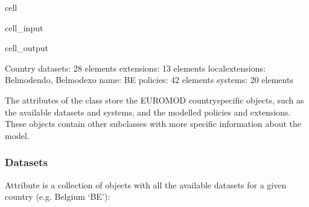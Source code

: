 \documentclass[letterpaper,10pt,english]{sphinxmanual}
\begin{document}
\begin{sphinxuseclass}{cell}
\begin{sphinxuseclass}{cell_input}
\begin{sphinxVerbatim}[commandchars=\\\{\}]
\PYG{p}{[}\PYG{p}{]}
\PYG{p}{[}\PYG{p}{]}
\PYG{p}{[}\PYG{p}{]}
\PYG{p}{[}\PYG{p}{]}
\end{sphinxVerbatim}

\end{sphinxuseclass}
\begin{sphinxuseclass}{cell_output}
\begin{sphinxVerbatim}[commandchars=\\\{\}]
\PYGZhy{}\PYGZhy{}\PYGZhy{}\PYGZhy{}\PYGZhy{}\PYGZhy{}\PYGZhy{}\PYGZhy{}\PYGZhy{}\PYGZhy{}\PYGZhy{}\PYGZhy{}\PYGZhy{}\PYGZhy{}\PYGZhy{}\PYGZhy{}\PYGZhy{}\PYGZhy{}\PYGZhy{}\PYGZhy{}\PYGZhy{}\PYGZhy{}\PYGZhy{}\PYGZhy{}\PYGZhy{}\PYGZhy{}\PYGZhy{}\PYGZhy{}\PYGZhy{}\PYGZhy{}
Country
\PYGZhy{}\PYGZhy{}\PYGZhy{}\PYGZhy{}\PYGZhy{}\PYGZhy{}\PYGZhy{}\PYGZhy{}\PYGZhy{}\PYGZhy{}\PYGZhy{}\PYGZhy{}\PYGZhy{}\PYGZhy{}\PYGZhy{}\PYGZhy{}\PYGZhy{}\PYGZhy{}\PYGZhy{}\PYGZhy{}\PYGZhy{}\PYGZhy{}\PYGZhy{}\PYGZhy{}\PYGZhy{}\PYGZhy{}\PYGZhy{}\PYGZhy{}\PYGZhy{}\PYGZhy{}
	 datasets: 28 elements
	 extensions: 13 elements
	 local\PYGZus{}extensions: Belmod\PYGZus{}endo, Belmod\PYGZus{}exo
	 name: \PYGZsq{}BE\PYGZsq{}
	 policies: 42 elements
	 systems: 20 elements
\end{sphinxVerbatim}

\end{sphinxuseclass}
\end{sphinxuseclass}
\sphinxAtStartPar
The attributes of the  class store the EUROMOD country\sphinxhyphen{}specific objects, such as the available datasets and systems, and the modelled policies and extensions. These objects contain other sub\sphinxhyphen{}classes with more specific information about the model.


\subsubsection{Datasets}
\label{\detokenize{notebooks/userguide:datasets}}
\sphinxAtStartPar
Attribute  is a collection of  objects with all the available datasets for a given country (e.g. Belgium ‘BE’):
\end{document}
